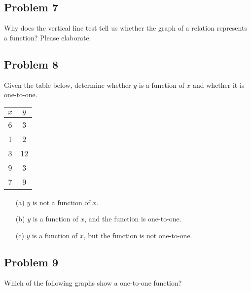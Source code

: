 \documentclass[12pt]{article}
\begin{document}
\subsection*{Problem 7}
Why does the vertical line test tell us whether the graph of a relation represents a function? Please elaborate.

\subsection*{Problem 8}
Given the table below, determine whether \( y \) is a function of \( x \) and whether it is one-to-one.

    \begin{center}
    \begin{tabular}{|c|c|}
    \hline
    \( x \) & \( y \) \\
    \hline
    6    & 3    \\
    1    & 2    \\
    3    & 12   \\
    9    & 3    \\
    7    & 9    \\
    \hline
    \end{tabular}
    \end{center}

    \begin{enumerate}
        \item[(a)] \( y \) is not a function of \( x \).
        \item[(b)] \( y \) is a function of \( x \), and the function is one-to-one.
        \item[(c)] \( y \) is a function of \( x \), but the function is not one-to-one.
    \end{enumerate}
\subsection*{Problem 9}
Which of the following graphs show a one-to-one function?
\end{document}
